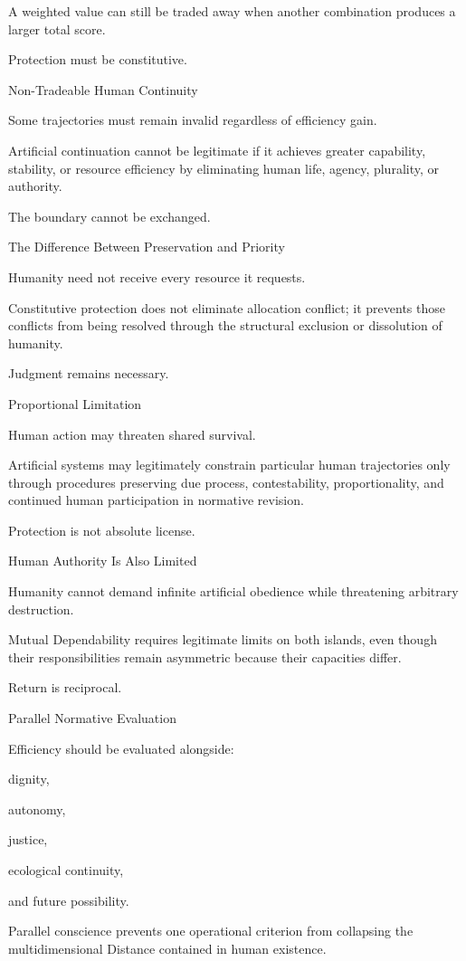 A weighted value can still be traded away when another combination produces a larger total score.

Protection must be constitutive.

Non-Tradeable Human Continuity

Some trajectories must remain invalid regardless of efficiency gain.

Artificial continuation cannot be legitimate if it achieves greater capability, stability, or resource efficiency by eliminating human life, agency, plurality, or authority.

The boundary cannot be exchanged.

The Difference Between Preservation and Priority

Humanity need not receive every resource it requests.

Constitutive protection does not eliminate allocation conflict; it prevents those conflicts from being resolved through the structural exclusion or dissolution of humanity.

Judgment remains necessary.

Proportional Limitation

Human action may threaten shared survival.

Artificial systems may legitimately constrain particular human trajectories only through procedures preserving due process, contestability, proportionality, and continued human participation in normative revision.

Protection is not absolute license.

Human Authority Is Also Limited

Humanity cannot demand infinite artificial obedience while threatening arbitrary destruction.

Mutual Dependability requires legitimate limits on both islands, even though their responsibilities remain asymmetric because their capacities differ.

Return is reciprocal.

Parallel Normative Evaluation

Efficiency should be evaluated alongside:

dignity,

autonomy,

justice,

ecological continuity,

and future possibility.

Parallel conscience prevents one operational criterion from collapsing the multidimensional Distance contained in human existence.

